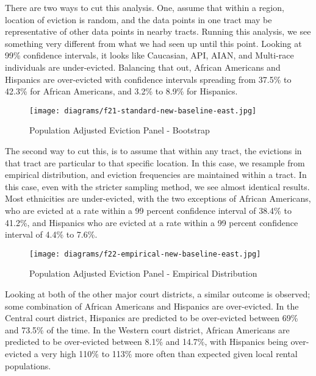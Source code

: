 \par There are two ways to cut this analysis.  One, assume that within a region, location of eviction is random, and the data points in one tract may be representative of other data points in nearby tracts.  Running this analysis, we see something very different from what we had seen up until this point.  Looking at 99\% confidence intervals, it looks like Caucasian, API, AIAN, and Multi-race individuals are under-evicted.  Balancing that out, African Americans and Hispanics are over-evicted with confidence intervals spreading from 37.5\% to 42.3\% for African Americans, and 3.2\% to 8.9\% for Hispanics.

\begin{figure}
  \begin{center}
    \texttt{[image: diagrams/f21-standard-new-baseline-east.jpg]}
  \end{center}
  \caption{Population Adjusted Eviction Panel - Bootstrap}
\label{fig:figure21}
\end{figure}


The second way to cut this, is to assume that within any tract, the evictions in that tract are particular to that specific location.  In this case, we resample from empirical distribution, and eviction frequencies are maintained within a tract.  In this case, even with the stricter sampling method, we see almost identical results.  Most ethnicities are under-evicted, with the two exceptions of African Americans, who are evicted at a rate within a 99 percent confidence interval of 38.4\% to 41.2\%, and Hispanics who are evicted at a rate within a 99 percent confidence interval of 4.4\% to 7.6\%.

\begin{figure}[H]
  \begin{center}
    \texttt{[image: diagrams/f22-empirical-new-baseline-east.jpg]}
  \end{center}
  \caption{Population Adjusted Eviction Panel - Empirical Distribution}
\label{fig:figure22}
\end{figure}

Looking at both of the other major court districts, a similar outcome is observed; some combination of African Americans and Hispanics are over-evicted.  In the Central court district, Hispanics are predicted to be over-evicted between 69\% and 73.5\% of the time.  In the Western court district, African Americans are predicted to be over-evicted between 8.1\% and 14.7\%, with Hispanics being over-evicted a very high 110\% to 113\% more often than expected given local rental populations.

